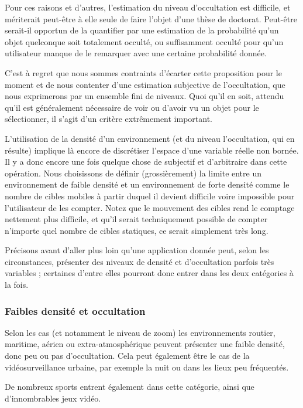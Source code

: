 	Pour ces raisons et d'autres, l'estimation du niveau d'occultation est difficile, et mériterait peut-être à elle seule de faire l'objet d'une thèse de doctorat. Peut-être serait-il opportun de la quantifier par une estimation de la probabilité qu'un objet quelconque soit totalement occulté, ou suffisamment occulté pour qu'un utilisateur manque de le remarquer avec une certaine probabilité donnée.
	
	C'est à regret que nous sommes contraints d'écarter cette proposition pour le moment et de nous contenter d'une estimation subjective de l'occultation, que nous exprimerons par un ensemble fini de niveaux. Quoi qu'il en soit, attendu qu'il est généralement nécessaire de voir ou d'avoir vu un objet pour le sélectionner, il s'agit d'un critère extrêmement important.
	
	L'utilisation de la densité d'un environnement (et du niveau l'occultation, qui en résulte) implique là encore de discrétiser l'espace d'une variable réelle non bornée. Il y a donc encore une fois quelque chose de subjectif et d'arbitraire dans cette opération. Nous choisissons de définir (grossièrement) la limite entre un environnement de faible densité et un environnement de forte densité comme le nombre de cibles mobiles à partir duquel il devient difficile voire impossible pour l'utilisateur de les compter. Notez que le mouvement des cibles rend le comptage nettement plus difficile, et qu'il serait techniquement possible de compter n'importe quel nombre de cibles statiques, ce serait simplement très long.
	
	Précisons avant d'aller plus loin qu'une application donnée peut, selon les circonstances, présenter des niveaux de densité et d'occultation parfois très variables ; certaines d'entre elles pourront donc entrer dans les deux catégories à la fois.
	
	\FloatBarrier \subsubsection{Faibles densité et occultation}
	Selon les cas (et notamment le niveau de zoom) les environnements routier, maritime, aérien ou extra-atmosphérique peuvent présenter une faible densité, donc peu ou pas d'occultation. Cela peut également être le cas de la vidéosurveillance urbaine, par exemple la nuit ou dans les lieux peu fréquentés.
	
	De nombreux sports entrent également dans cette catégorie, ainsi que d'innombrables jeux vidéo.
	
